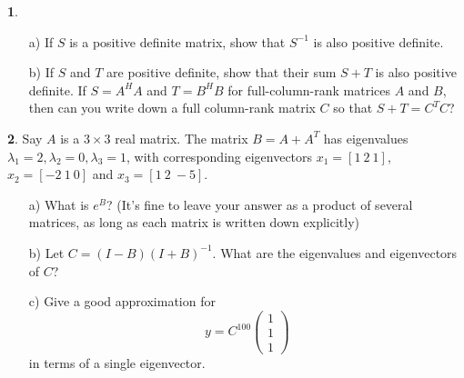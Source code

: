 \documentclass{article}
\theoremstyle{definition}
\newtheorem{prob}{}
\begin{document}
\begin{prob}
\begin{itemize}
	\item[a)] If $S$ is a positive definite matrix, show that $S^{-1}$ is also positive definite.
	\item[b)] If $S$ and $T$ are positive definite, show that their sum $S + T$ is also positive definite.   If $S = A^HA$ and $T = B^HB$ for full-column-rank matrices $A$ and $B$, then can you write down a full column-rank matrix $C$ so that $S +T = C^TC$?
\end{itemize}
\end{prob}


\begin{prob}
	Say $A$ is a $3 \times 3$ real matrix. The matrix $B=A+A^T$ has eigenvalues $\lambda_1=2, \lambda_2=0, \lambda_3=1$, with corresponding eigenvectors $x_1=[1\ 2\ 1]$, $x_2=[-2\ 1\ 0]$ and $x_3=[1 \ 2\ -5]$.
	\begin{itemize}
		\item[a)] What is $e^B$? (It's fine to leave your answer as a product of several matrices, as long as each matrix is written down explicitly)
		\item[b)] Let $C=(I-B)(I+B)^{-1}$. What are the eigenvalues and eigenvectors of $C$?
		\item[c)] Give a good approximation for 
		\[y=C^{100} \begin{pmatrix}
			1\\1\\1
		\end{pmatrix}\]
		in terms of a single eigenvector.
	\end{itemize}
\end{prob}
\end{document}
